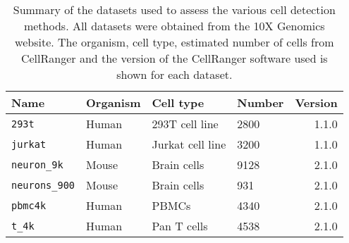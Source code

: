 \documentclass{article}
\newcommand{\code}[1]{\texttt{#1}}
\begin{document}
\begin{table}[btp]
\caption{Summary of the datasets used to assess the various cell detection methods.
    All datasets were obtained from the 10X Genomics website.
The organism, cell type, estimated number of cells from CellRanger and the version of the CellRanger software used is shown for each dataset.}
\begin{center}
\begin{tabular}{l l l l r}
\hline
\textbf{Name} & \textbf{Organism} & \textbf{Cell type} & \textbf{Number} & \textbf{Version} \\
\hline
\code{293t}   & Human & 293T cell line & 2800 & 1.1.0 \\
\code{jurkat} & Human & Jurkat cell line & 3200 & 1.1.0 \\
\code{neuron\_9k} & Mouse & Brain cells & 9128 & 2.1.0 \\
\code{neurons\_900} & Mouse & Brain cells & 931 & 2.1.0 \\
\code{pbmc4k} & Human & PBMCs & 4340 & 2.1.0 \\
\code{t\_4k} & Human & Pan T cells & 4538 & 2.1.0 \\
\hline
\end{tabular}
\end{center}
\label{tab:datasets}
\end{table}
\end{document}
